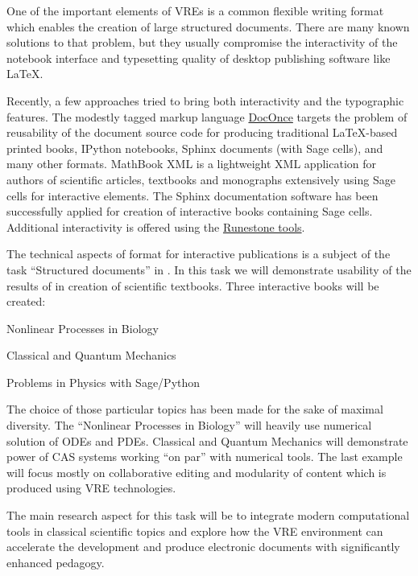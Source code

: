 \begin{workpackage}
\begin{tasklist}
\begin{task}[title=Introduce \TheProject to Researchers and Teachers, id=project-intro,lead=USH,PM=14]
\begin{task}[title=Demonstrator: Interactive books,
id=ibook,lead=US,PM=30]
  
One of the important elements of VREs is a common flexible writing format which
enables the creation of large structured documents. There are many
known solutions to that problem, but they usually compromise the
interactivity of the notebook interface and typesetting quality of desktop
publishing software like LaTeX.

Recently, a few approaches tried to bring both interactivity and the
typographic features. The modestly tagged markup language
\href{http://hplgit.github.io/doconce/doc/web/}{DocOnce}
targets the problem of reusability of the document source code for
producing traditional LaTeX-based printed books, IPython notebooks, Sphinx
documents (with Sage cells), and many other formats. MathBook XML
is a lightweight XML application for authors of scientific articles,
textbooks and monographs extensively using Sage cells for
interactive elements. The Sphinx documentation software has been
successfully applied for creation of interactive books containing Sage
cells. Additional interactivity is offered using the \href{http://runestoneinteractive.org}{Runestone tools}.

The technical aspects of format for interactive publications is a
subject of the task ``Structured documents'' in
. In this task we will demonstrate usability
of the results of  in creation of scientific
textbooks. Three interactive books will be created:

\begin{compactitem}
\item Nonlinear Processes in Biology
\item Classical and Quantum Mechanics
\item Problems in Physics with Sage/Python
\end{compactitem}

The choice of those particular topics has been made for the sake of
maximal diversity. The ``Nonlinear Processes in Biology'' will heavily
use numerical solution of ODEs and PDEs.
Classical and Quantum Mechanics will demonstrate power of
CAS systems working ``on par'' with numerical tools. The last example
will focus mostly on collaborative editing and modularity of content
which is produced using VRE technologies.

The main research aspect for this task will be to integrate modern
computational tools in classical scientific topics and explore how
the VRE environment can accelerate the development and produce electronic
documents with significantly enhanced pedagogy.


\end{task}
\end{task}
\end{tasklist}
\end{workpackage}

